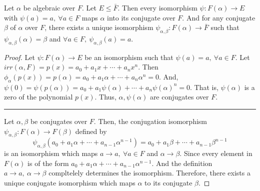 \begin{corollary}
	Let $\alpha$ be algebraic over $F$.
	Let $E \le \bar{F}$.
	Then every isomorphism $\psi : F(\alpha) \to E$ with $\psi(a) = a,\ \forall a \in F$ maps $\alpha$ into its conjugate over $F$.
	And for any conjugate $\beta$ of $\alpha$ over $F$, there exists a unique isomorphism $\psi_{\alpha,\beta} : F(\alpha) \to \bar{F}$ such that $\psi_{\alpha,\beta}(\alpha) = \beta$ and $\forall a \in F,\ \psi_{\alpha,\beta}(a) = a$.
\end{corollary}
\begin{proof} 
	Let $\psi : F(\alpha) \to E$ be an isomorphism such that $\psi(a) = a,\ \forall a \in F$.
	Let $irr(\alpha,F) = p(x) = a_0 + a_1x + \dotsb + a_nx^n$.
	Then $\phi_\alpha(p(x)) = p(\alpha) = a_0 + a_1\alpha + \dotsb + a_n \alpha^n = 0$.
	And, $\psi(0) = \psi(p(\alpha)) = a_0 + a_1 \psi(\alpha) + \dotsb + a_n \psi(\alpha)^n = 0$.
	That is, $\psi(\alpha)$ is a zero of the polynomial $p(x)$.
	Thus, $\alpha,\psi(\alpha)$ are conjugates over $F$.\\

	\hrule\vspace{1em}

	Let $\alpha,\beta$ be conjugates over $F$.
	Then, the conjugation isomorphism $\psi_{\alpha,\beta} : F(\alpha) \to F(\beta)$ defined by
	\[ \psi_{\alpha,\beta}(a_0 + a_1\alpha + \dotsb + a_{n-1} \alpha^{n-1}) = a_0 + a_1 \beta + \dotsb + a_{n-1} \beta^{n-1} \]
	is an isomorphism which maps $a \to a,\ \forall a \in F$ and $\alpha \to \beta$.
	Since every element in $F(\alpha)$ is of the form $a_0 + a_1 \alpha + \dotsb + a_{n-1}\alpha^{n-1}$.
	And the definition $a \to a,\ \alpha \to \beta$ compltelely determines the isomorphism.
	Therefore, there exists a unique conjugate isomorphism which maps $\alpha$ to its conjugate $\beta$.
\end{proof} 

